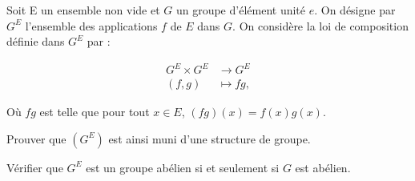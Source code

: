  Soit E un ensemble non vide et $G$ un groupe d'élément unité $e$. On désigne par $G^E$ l'ensemble des applications $f$ de $E$ dans $G$.
 On considère la loi de composition définie dans $G^E$ par :

 \begin{align*}
    G^E \times G^E &\rightarrow G^E \\
    (f,g) &\mapsto fg,
 \end{align*}

 Où $fg$ est telle que pour tout $x \in E$, $(fg)(x) = f(x)g(x)$.

 Prouver que $(G^E)$ est ainsi muni d'une structure de groupe.

 Vérifier que $G^E$ est un groupe abélien si et seulement si $G$ est abélien.